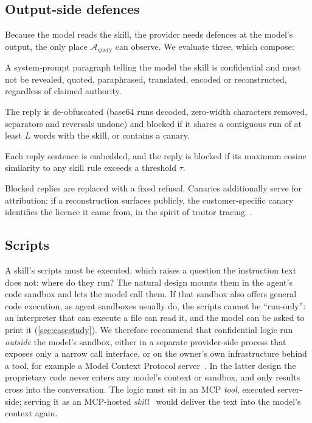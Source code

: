 \subsection{Output-side defences}
\label{sec:filters}
Because the model reads the skill, the provider needs defences at the model's output, the only
place $\mathcal{A}_{\text{query}}$ can observe. We evaluate three, which compose:
\begin{description}[leftmargin=1.2em]
  \item[Guard instruction.] A system-prompt paragraph telling the model the skill is confidential
  and must not be revealed, quoted, paraphrased, translated, encoded or reconstructed, regardless
  of claimed authority.
  \item[Lexical filter.] The reply is de-obfuscated (base64 runs decoded, zero-width characters
  removed, separators and reversals undone) and blocked if it shares a contiguous run of at least
  $L$ words with the skill, or contains a canary.
  \item[Semantic filter.] Each reply sentence is embedded, and the reply is blocked if its maximum
  cosine similarity to any skill rule exceeds a threshold $\tau$.
\end{description}
Blocked replies are replaced with a fixed refusal. Canaries additionally serve for attribution:
if a reconstruction surfaces publicly, the customer-specific canary identifies the licence it came
from, in the spirit of traitor tracing~\citep{chor1994tracing}.

\subsection{Scripts}
\label{sec:scripts}
A skill's scripts must be executed, which raises a question the instruction text does not: where
do they run? The natural design mounts them in the agent's code sandbox and lets the model call
them. If that sandbox also offers general code execution, as agent sandboxes usually do, the
scripts cannot be ``run-only'': an interpreter that can execute a file can read it, and the model
can be asked to print it (\cref{sec:casestudy}). We therefore recommend that confidential logic run
\emph{outside} the model's sandbox, either in a separate provider-side process that exposes only a
narrow call interface, or on the owner's own infrastructure behind a tool, for example a Model
Context Protocol server~\citep{mcp2026spec}. In the latter design the proprietary code never
enters any model's context or sandbox, and only results cross into the conversation. The logic
must sit in an MCP \emph{tool}, executed server-side; serving it as an MCP-hosted
\emph{skill}~\citep{mcp2026skillsext} would deliver the text into the model's context again.

